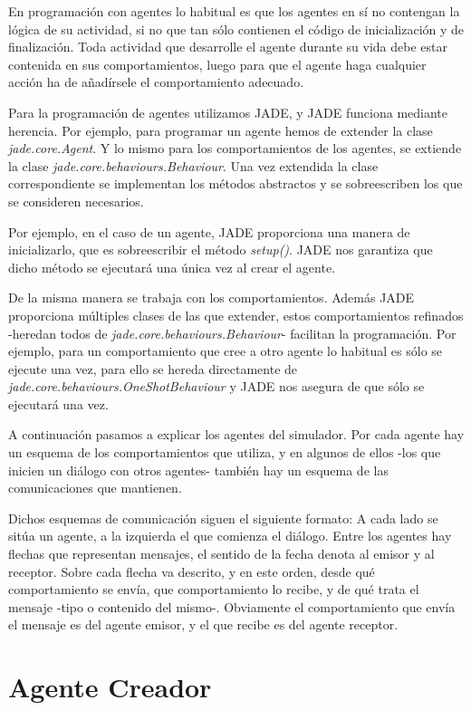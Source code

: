 En programación con agentes lo habitual es que los agentes en sí no contengan
la lógica de su actividad, si no que tan sólo contienen el código de
inicialización y de finalización. Toda actividad que desarrolle el agente
durante su vida debe estar contenida en sus comportamientos, luego para que el
agente haga cualquier acción ha de añadírsele el comportamiento adecuado.

Para la programación de agentes utilizamos JADE, y JADE funciona mediante
herencia. Por ejemplo, para programar un agente hemos de extender la clase {\em
jade.core.Agent}. Y lo mismo para los comportamientos de los agentes, se
extiende la clase {\em jade.core.behaviours.Behaviour}. Una vez extendida la
clase correspondiente se implementan los métodos abstractos y se sobreescriben
los que se consideren necesarios.

Por ejemplo, en el caso de un agente, JADE proporciona una manera de
inicializarlo, que es sobreescribir el método {\em setup()}. JADE nos garantiza
que dicho método se ejecutará una única vez al crear el agente.

De la misma manera se trabaja con los comportamientos. Además JADE proporciona
múltiples clases de las que extender, estos comportamientos refinados -heredan
todos de {\em jade.core.behaviours.Behaviour}- facilitan la programación. Por
ejemplo, para un comportamiento que cree a otro agente lo habitual es sólo se
ejecute una vez, para ello se hereda directamente de {\em
jade.core.behaviours.OneShotBehaviour} y JADE nos asegura de que sólo se
ejecutará una vez.

A continuación pasamos a explicar los agentes del simulador. Por cada agente
hay un esquema de los comportamientos que utiliza, y en algunos de ellos -los
que inicien un diálogo con otros agentes- también hay un esquema de las
comunicaciones que mantienen.

Dichos esquemas de comunicación siguen el siguiente formato: A cada lado se
sitúa un agente, a la izquierda el que comienza el diálogo. Entre los agentes
hay flechas que representan mensajes, el sentido de la fecha denota al emisor y
al receptor. Sobre cada flecha va descrito, y en este orden, desde qué
comportamiento se envía, que comportamiento lo recibe, y de qué trata el
mensaje -tipo o contenido del mismo-. Obviamente el comportamiento que envía el
mensaje es del agente emisor, y el que recibe es del agente receptor.

\section{Agente Creador}

